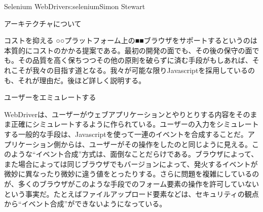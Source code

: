 \begin{aosachapter}{Selenium WebDriver}{s:selenium}{Simon Stewart}
\begin{aosasect1}{アーキテクチャについて}
\begin{aosasect2}{コストを抑える}
○○プラットフォーム上の■■ブラウザをサポートするというのは本質的にコストのかかる提案である。最初の開発の面でも、その後の保守の面でも。その品質を高く保ちつつその他の原則を破らずに済む手段がもしあれば、それこそが我々の目指す道となる。我々が可能な限りJavascriptを採用しているのも、それが理由だ。後ほど詳しく説明する。

\end{aosasect2}

\begin{aosasect2}{ユーザーをエミュレートする}

WebDriverは、ユーザーがウェブアプリケーションとやりとりする内容をそのまま正確にシミュレートするように作られている。ユーザーの入力をシミュレートする一般的な手段は、Javascriptを使って一連のイベントを合成することだ。アプリケーション側からは、ユーザーがその操作をしたのと同じように見える。このような``イベント合成''方式は、面倒なことだらけである。ブラウザによって、また場合によっては同じブラウザでもバージョンによって、発火するイベントが微妙に異なったり微妙に違う値をとったりする。さらに問題を複雑にしているのが、多くのブラウザがこのような手段でのフォーム要素の操作を許可していないという事実だ。たとえばファイルアップロード要素などは、セキュリティの観点から``イベント合成''ができないようになっている。


\end{aosasect2}
\end{aosasect1}
\end{aosachapter}
